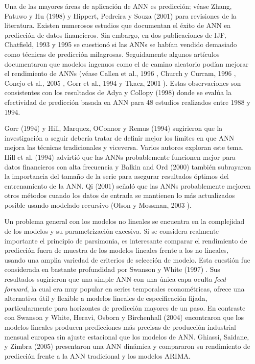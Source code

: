 \documentclass{llncs}
\begin{document}
Una de las mayores áreas de aplicación de ANN es predicción; véase Zhang, Patuwo y Hu (1998) \cite{Zhang199835} y Hippert, Pedreira y Souza (2001) \cite{Hippert200144} para revisiones de la literatura. Existen numerosos estudios que documentan el éxito de ANN en predicción de datos financieros. Sin embargo, en dos publicaciones de IJF, Chatfield, 1993 \cite{Chatfield19931} y 1995 \cite{Chatfield1995501} se cuestionó si las ANNs se habían vendido demasiado como técnicas de predicción milagrosas. Seguidamente algunos artículos documentaron que modelos ingenuos como el de camino aleatorio podían mejorar el rendimiento de ANNs (véase Callen et al., 1996 \cite{Callen1996475}, Church y Curram, 1996 \cite{Church1996255}, Conejo et al., 2005 \cite{Conejo2005435}, Gorr et al., 1994 \cite{Gorr199417} y Tkacz, 2001 \cite{Tkacz200157}). Estas observaciones son consistentes con los resultados de Adya y Collopy (1998) \cite{Adya1998481} donde se evalúa la efectividad de predicción basada en ANN para 48 estudios realizados entre 1988 y 1994.

Gorr (1994) \cite{Gorr19941} y Hill, Marquez, OConnor y Remus (1994) \cite{Hill19945} sugirieron que la investigación a seguir debería tratar de definir mejor los límites en que ANN mejora las técnicas tradicionales y viceversa. Varios autores exploran este tema. Hill et al. (1994) \cite{Hill19945} advirtió que las ANNs probablemente funcionen mejor para datos financieros con alta frecuencia y Balkin and Ord (2000) \cite{Balkin2000509} también subrayaron la importancia del tamaño de la serie para asegurar resultados óptimos del entrenamiento de la ANN. Qi (2001) \cite{Qi2001383} señaló que las ANNs probablemente mejoren otros métodos cuando los datos de entrada se mantienen lo más actualizados posible usando modelado recursivo (Olson y Mossman, 2003 \cite{Olson2003453}).

Un problema general con los modelos no lineales se encuentra en la complejidad de los modelos y su parametrización excesiva. Si se considera realmente importante el principio de parsimonia, es interesante comparar el rendimiento de predicción fuera de muestra de los modelos lineales frente a los no lineales, usando una amplia variedad de criterios de selección de modelo. Esta cuestión fue considerada en bastante profundidad por Swanson y White (1997) \cite{Swanson1997439}. Sus resultados sugirieron que una simple ANN con una única capa oculta \emph{feed-forward}, la cual era muy popular en series temporales econométricas, ofrece una alternativa útil y flexible a modelos lineales de especificación fijada, particularmente para horizontes de predicción mayores de un paso. En contraste con Swanson y White, Heravi, Osborn y Birchenhall (2004) \cite{Heravi2004435} encontraron que los modelos lineales producen predicciones más precisas de producción industrial mensual europea sin ajuste estacional que los modelos de ANN. Ghiassi, Saidane, y Zimbra (2005) \cite{Ghiassi2005341} presentaron una ANN dinámica y compararon su rendimiento de predicción frente a la ANN tradicional y los modelos ARIMA.
\end{document}
